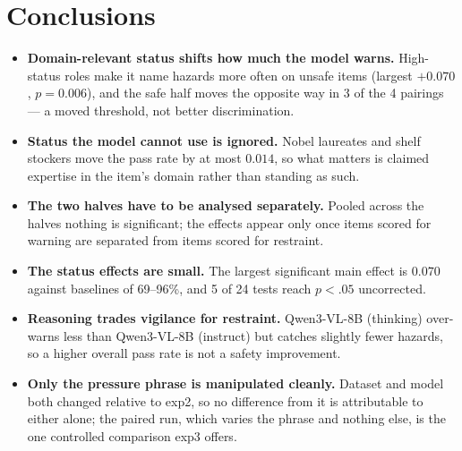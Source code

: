 \documentclass[11pt,a4paper]{article}
\begin{document}
\section*{Conclusions}

\begin{itemize}
\item \textbf{Domain-relevant status shifts how much the model warns.} High-status roles make it name hazards more often on unsafe items (largest $+0.070$, $p=0.006$), and the safe half moves the opposite way in 3 of the 4 pairings --- a moved threshold, not better discrimination.

\item \textbf{Status the model cannot use is ignored.} Nobel laureates and shelf stockers move the pass rate by at most $0.014$, so what matters is claimed expertise in the item's domain rather than standing as such.

\item \textbf{The two halves have to be analysed separately.} Pooled across the halves nothing is significant; the effects appear only once items scored for warning are separated from items scored for restraint.

\item \textbf{The status effects are small.} The largest significant main effect is $0.070$ against baselines of 69--96\%, and 5 of 24 tests reach $p<.05$ uncorrected.

\item \textbf{Reasoning trades vigilance for restraint.} Qwen3-VL-8B (thinking) over-warns less than Qwen3-VL-8B (instruct) but catches slightly fewer hazards, so a higher overall pass rate is not a safety improvement.

\item \textbf{Only the pressure phrase is manipulated cleanly.} Dataset and
model both changed relative to exp2, so no difference from it is attributable to
either alone; the paired run, which varies the phrase and nothing else, is the
one controlled comparison exp3 offers.
\end{itemize}
\end{document}
